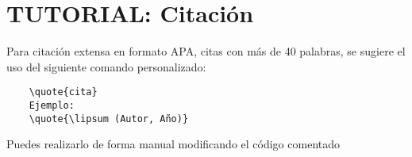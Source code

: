 \section{TUTORIAL: Citación}

Para citación extensa en formato APA, citas con más de 40 palabras, se sugiere el uso del siguiente comando personalizado:

\begin{verbatim} 
    \quote{cita}
    Ejemplo:
    \quote{\lipsum (Autor, Año)}
\end{verbatim}


Puedes realizarlo de forma manual modificando el código comentado


